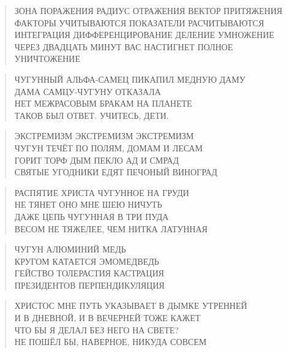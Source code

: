 \poemtitle{***}
\begin{verse}
ЗОНА ПОРАЖЕНИЯ РАДИУС ОТРАЖЕНИЯ ВЕКТОР ПРИТЯЖЕНИЯ\\
ФАКТОРЫ УЧИТЫВАЮТСЯ ПОКАЗАТЕЛИ РАСЧИТЫВАЮТСЯ\\
ИНТЕГРАЦИЯ ДИФФЕРЕНЦИРОВАНИЕ ДЕЛЕНИЕ УМНОЖЕНИЕ\\
ЧЕРЕЗ ДВАДЦАТЬ МИНУТ ВАС НАСТИГНЕТ ПОЛНОЕ УНИЧТОЖЕНИЕ
\end{verse}

\poemtitle{***}
\begin{verse}
ЧУГУННЫЙ АЛЬФА-САМЕЦ ПИКАПИЛ МЕДНУЮ ДАМУ\\
ДАМА САМЦУ-ЧУГУНУ ОТКАЗАЛА\\
НЕТ МЕЖРАСОВЫМ БРАКАМ НА ПЛАНЕТЕ\\
ТАКОВ БЫЛ ОТВЕТ. УЧИТЕСЬ, ДЕТИ.
\end{verse}

\poemtitle{***}
\begin{verse}
ЭКСТРЕМИЗМ ЭКСТРЕМИЗМ ЭКСТРЕМИЗМ\\
ЧУГУН ТЕЧЁТ ПО ПОЛЯМ, ДОМАМ И ЛЕСАМ\\
ГОРИТ ТОРФ ДЫМ ПЕКЛО АД И СМРАД\\
СВЯТЫЕ УГОДНИКИ ЕДЯТ ПЕЧОНЫЙ ВИНОГРАД
\end{verse}

\poemtitle{***}
\begin{verse}
РАСПЯТИЕ ХРИСТА ЧУГУННОЕ НА ГРУДИ\\
НЕ ТЯНЕТ ОНО МНЕ ШЕЮ НИЧУТЬ\\
ДАЖЕ ЦЕПЬ ЧУГУННАЯ В ТРИ ПУДА\\
ВЕСОМ НЕ ТЯЖЕЛЕЕ, ЧЕМ НИТКА ЛАТУННАЯ
\end{verse}

\poemtitle{***}
\begin{verse}
ЧУГУН АЛЮМИНИЙ МЕДЬ\\
КРУГОМ КАТАЕТСЯ ЭМОМЕДВЕДЬ\\
ГЕЙСТВО ТОЛЕРАСТИЯ КАСТРАЦИЯ\\
ПРЕЗИДЕНТОВ ПЕРПЕНДИКУЛЯЦИЯ
\end{verse}

\poemtitle{***}
\begin{verse}
ХРИСТОС МНЕ ПУТЬ УКАЗЫВАЕТ В ДЫМКЕ УТРЕННЕЙ\\
И В ДНЕВНОЙ, И В ВЕЧЕРНЕЙ ТОЖЕ КАЖЕТ\\
ЧТО БЫ Я ДЕЛАЛ БЕЗ НЕГО НА СВЕТЕ?\\
НЕ ПОШЁЛ БЫ, НАВЕРНОЕ, НИКУДА СОВСЕМ
\end{verse}

